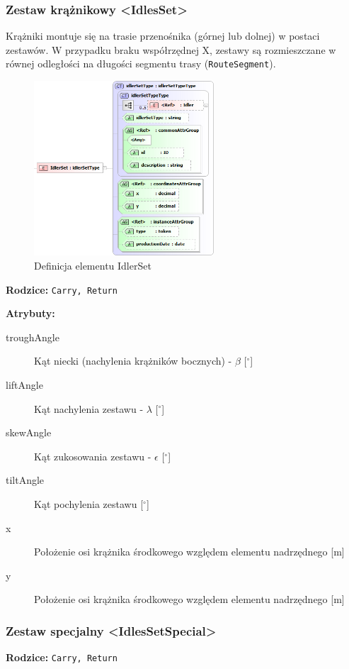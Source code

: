 \documentclass[12pt,a4paper]{article}
\begin{document}
\subsubsection{Zestaw krążnikowy <IdlesSet>}
Krążniki montuje się na trasie przenośnika (górnej lub dolnej) w postaci
zestawów.  W przypadku braku współrzędnej X, zestawy są rozmieszczane w równej
odległości na długości segmentu trasy ({\tt RouteSegment}).

\begin{figure}[H]
  \centering
  \includegraphics[width=0.6\textwidth]{png/liquid/IdlerSet}
  \caption{Definicja elementu IdlerSet}
  \label{fig:idlerSet-xsd}
\end{figure}

\noindent\textbf{Rodzice:} \texttt{Carry, Return}

\noindent\textbf{Atrybuty:}
\begin{description}
\item[troughAngle] Kąt niecki (nachylenia krążników bocznych) - $\beta$ [$^\circ$]
\item[liftAngle] Kąt nachylenia zestawu - $\lambda$ [$^\circ$]
\item[skewAngle] Kąt zukosowania zestawu - $\epsilon$ [$^\circ$]
\item[tiltAngle] Kąt pochylenia zestawu [$^\circ$]
\item[x] Położenie osi krążnika środkowego względem elementu nadrzędnego [m]
\item[y] Położenie osi krążnika środkowego względem elementu nadrzędnego [m]
\end{description}


\subsubsection{Zestaw specjalny <IdlesSetSpecial>}
\noindent\textbf{Rodzice:} \texttt{Carry, Return}
\end{document}
